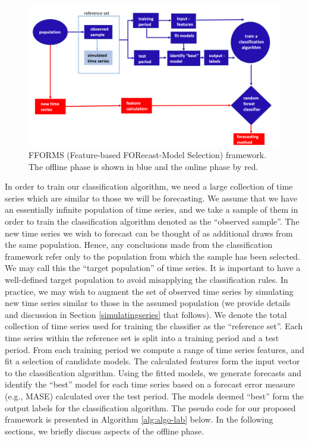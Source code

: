 \documentclass[11pt,a4paper,]{article}
\begin{document}
\begin{figure}

{\centering \includegraphics[width=\textwidth]{figures/framework} 

}

\caption{FFORMS (Feature-based FORecast-Model Selection) framework. The offline phase is shown in blue and the online phase by red.}\label{fig:framework}
\end{figure}

In order to train our classification algorithm, we need a large
collection of time series which are similar to those we will be
forecasting. We assume that we have an essentially infinite population
of time series, and we take a sample of them in order to train the
classification algorithm denoted as the ``observed sample''. The new
time series we wish to forecast can be thought of as additional draws
from the same population. Hence, any conclusions made from the
classification framework refer only to the population from which the
sample has been selected. We may call this the ``target population'' of
time series. It is important to have a well-defined target population to
avoid misapplying the classification rules. In practice, we may wish to
augment the set of observed time series by simulating new time series
similar to those in the assumed population (we provide details and
discussion in Section \ref{simulatingseries} that follows). We denote
the total collection of time series used for training the classifier as
the ``reference set''. Each time series within the reference set is
split into a training period and a test period. From each training
period we compute a range of time series features, and fit a selection
of candidate models. The calculated features form the input vector to
the classification algorithm. Using the fitted models, we generate
forecasts and identify the ``best'' model for each time series based on
a forecast error measure (e.g., MASE) calculated over the test period.
The models deemed ``best'' form the output labels for the classification
algorithm. The pseudo code for our proposed framework is presented in
Algorithm \ref{alg:algo-lab} below. In the following sections, we
briefly discuss aspects of the offline phase.
\end{document}
